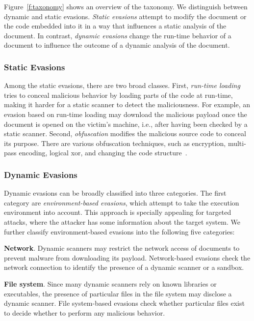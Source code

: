 Figure~\ref{f:taxonomy} shows an overview of the taxonomy.
We distinguish between dynamic and static evasions.
\emph{Static evasions} attempt to modify the document or the code embedded 
into it in a way that influences a static analysis of the document.
In contrast, \emph{dynamic evasions} change the run-time behavior of a 
document to influence the outcome of a dynamic analysis of the document.

\subsubsection{Static Evasions}
Among the static evasions, there are two broad classes.
First, \emph{run-time loading} tries to conceal malicious behavior by loading 
parts of the code at run-time, making it harder for a static scanner to 
detect the maliciousness.
For example, an evasion based on run-time loading may download the malicious 
payload once the document is opened on the victim's machine, i.e., after 
having been checked by a static scanner.
Second, \emph{obfuscation} modifies the malicious source code to conceal its 
purpose.
There are various obfuscation techniques, such as encryption, multi-pass 
encoding, logical xor, and changing the code 
structure~\cite{pdfstaticevasion}.

\subsubsection{Dynamic Evasions}
Dynamic evasions can be broadly classified into three categories.
The first category are \emph{environment-based evasions}, which attempt to 
take the execution environment into account.
This approach is specially appealing for targeted attacks, where the 
attacker has some information about the target system. We further classify environment-based evasions 
into the following five categories:

\textbf{Network}.
    Dynamic scanners may restrict the network access of documents to prevent malware from downloading its payload.
    Network-based evasions check the network connection to identify the 
    presence of a dynamic scanner or a sandbox.
  
\textbf{File system}.
    Since many dynamic scanners rely on known libraries or executables, the 
    presence of particular files in the file system may disclose a dynamic 
    scanner.
    File system-based evasions check whether particular files exist to 
    decide whether to perform any malicious behavior.

